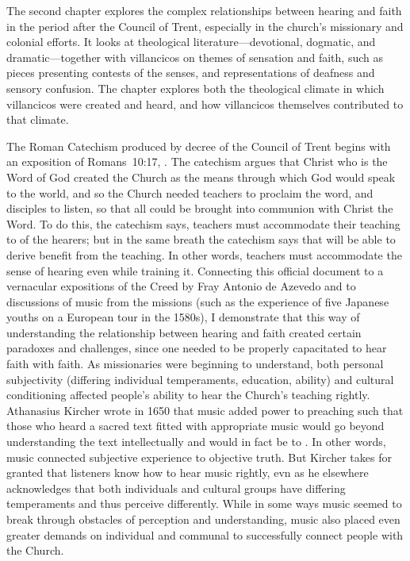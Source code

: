 The second chapter explores the complex relationships between hearing and faith in the period after the Council of Trent, especially in the church's missionary and colonial efforts.
It looks at theological literature---devotional, dogmatic, and dramatic---together with villancicos on themes of sensation and faith, such as pieces presenting contests of the senses, and representations of deafness and sensory confusion.
The chapter explores both the theological climate in which villancicos were created and heard, and how villancicos themselves contributed to that climate.

The Roman Catechism produced by decree of the Council of Trent begins with an exposition of Romans~10:17, .
The catechism argues that Christ who is the Word of God created the Church as the means through which God would speak to the world, and so the Church needed teachers to proclaim the word, and disciples to listen, so that all could be brought into communion with Christ the Word.
To do this, the catechism says, teachers must accommodate their teaching to  of the hearers; but in the same breath the catechism says that  will be able to derive benefit from the teaching.
In other words, teachers must accommodate the sense of hearing even while training it.
Connecting this official document to a vernacular expositions of the Creed by Fray Antonio de Azevedo and to discussions of music from the missions (such as the experience of five Japanese youths on a European tour in the 1580s), I demonstrate that this way of understanding the relationship between hearing and faith created certain paradoxes and challenges, since one needed to be properly capacitated to hear faith with faith.
As missionaries were beginning to understand, both personal subjectivity (differing individual temperaments, education, ability) and cultural conditioning affected people's ability to hear the Church's teaching rightly.
Athanasius Kircher wrote in 1650 that music added power to preaching such that those who heard a sacred text fitted with appropriate music would go beyond understanding the text intellectually and would in fact be  to .
In other words, music connected subjective experience to objective truth. 
But Kircher takes for granted that listeners know how to hear music rightly, evn as he elsewhere acknowledges that both individuals and cultural groups have differing temperaments and thus perceive differently.
While in some ways music seemed to break through obstacles of perception and understanding, music also placed even greater demands on individual and communal  to successfully connect people with the Church.

